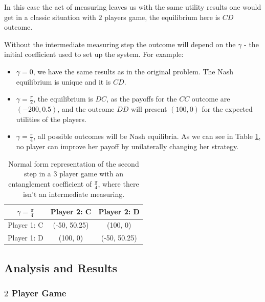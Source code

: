 In this case the act of measuring leaves us with the same utility results one would get in a classic situation with $2$ players game, the equilibrium here is $CD$ outcome. 

Without the intermediate measuring step the outcome will depend on the $\gamma$ - the initial coefficient used to set up the system. For example:

\begin{itemize}
\item $\gamma = 0$, we have the same results as in the original problem. The Nash equilibrium is unique and it is $CD$.
\item $\gamma = \frac{\pi}{2}$, the equilibrium is $DC$, as the payoffs for the $CC$ outcome are $(-200, 0.5)$, and the outcome $DD$ will present $(100, 0)$ for the expected utilities of the players.
\item $\gamma = \frac{\pi}{4}$, all possible outcomes will be Nash equilibria. As we can see in Table \ref{tab:hate_myself}, no player can improve her payoff by unilaterally changing her strategy.



\end{itemize}

\begin{center}
\begin{table}
\begin{centering}
\begin{tabular}{ccc}
\hline 
 $\gamma = \frac{\pi}{4}$ & Player 2: C & Player 2: D\tabularnewline
\hline 
Player 1: C & (-50, 50.25) & (100, 0)\tabularnewline
Player 1: D & (100, 0) & (-50, 50.25)\tabularnewline
\hline 
\end{tabular}
\par\end{centering}

\caption{Normal form representation of the second step in a 3 player game with an entanglement coefficient of $\frac{\pi}{4}$, where there isn't an intermediate measuring. }
\label{tab:hate_myself}
\end{table}
\end{center}


\subsection{Analysis and Results}
\label{subsec:description_3}

\subsubsection{$2$ Player Game}
\label{subsubsec:2playergame}


